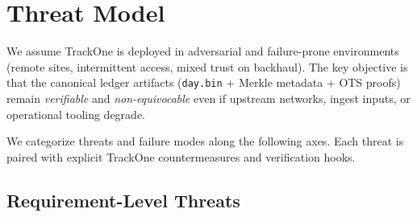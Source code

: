 \section{Threat Model}
\label{sec:threat-model}

We assume TrackOne is deployed in adversarial and failure-prone environments (remote sites, intermittent access, mixed trust on backhaul).
The key objective is that the canonical ledger artifacts (\texttt{day.bin} + Merkle metadata + \ac{OTS} proofs) remain \emph{verifiable} and \emph{non-equivocable} even if upstream networks, ingest inputs, or operational tooling degrade.

We categorize threats and failure modes along the following axes.
Each threat is paired with explicit TrackOne countermeasures and verification hooks.

\subsection{Requirement-Level Threats}
\label{subsec:threat-model}

